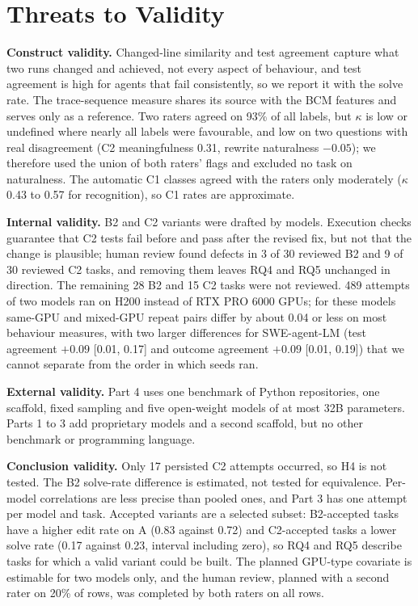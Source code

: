 \documentclass[conference]{IEEEtran}
\newcommand{\bcm}{\textsc{BCM}}
\begin{document}
\section{Threats to Validity}
\label{sec:threats}
\textbf{Construct validity.} Changed-line similarity and test agreement capture what two runs changed and achieved, not every aspect of behaviour, and test agreement is high for agents that fail consistently, so we report it with the solve rate. The trace-sequence measure shares its source with the \bcm{} features and serves only as a reference. Two raters agreed on 93\% of all labels, but $\kappa$ is low or undefined where nearly all labels were favourable, and low on two questions with real disagreement (C2 meaningfulness 0.31, rewrite naturalness $-0.05$); we therefore used the union of both raters' flags and excluded no task on naturalness. The automatic C1 classes agreed with the raters only moderately ($\kappa$ 0.43 to 0.57 for recognition), so C1 rates are approximate.

\textbf{Internal validity.} B2 and C2 variants were drafted by models. Execution checks guarantee that C2 tests fail before and pass after the revised fix, but not that the change is plausible; human review found defects in 3 of 30 reviewed B2 and 9 of 30 reviewed C2 tasks, and removing them leaves RQ4 and RQ5 unchanged in direction. The remaining 28 B2 and 15 C2 tasks were not reviewed. 489 attempts of two models ran on H200 instead of RTX PRO 6000 GPUs; for these models same-GPU and mixed-GPU repeat pairs differ by about 0.04 or less on most behaviour measures, with two larger differences for SWE-agent-LM (test agreement $+0.09$ [0.01, 0.17] and outcome agreement $+0.09$ [0.01, 0.19]) that we cannot separate from the order in which seeds ran.

\textbf{External validity.} Part 4 uses one benchmark of Python repositories, one scaffold, fixed sampling and five open-weight models of at most 32B parameters. Parts 1 to 3 add proprietary models and a second scaffold, but no other benchmark or programming language.

\textbf{Conclusion validity.} Only 17 persisted C2 attempts occurred, so H4 is not tested. The B2 solve-rate difference is estimated, not tested for equivalence. Per-model correlations are less precise than pooled ones, and Part 3 has one attempt per model and task. Accepted variants are a selected subset: B2-accepted tasks have a higher edit rate on A (0.83 against 0.72) and C2-accepted tasks a lower solve rate (0.17 against 0.23, interval including zero), so RQ4 and RQ5 describe tasks for which a valid variant could be built. The planned GPU-type covariate is estimable for two models only, and the human review, planned with a second rater on 20\% of rows, was completed by both raters on all rows.
\end{document}

